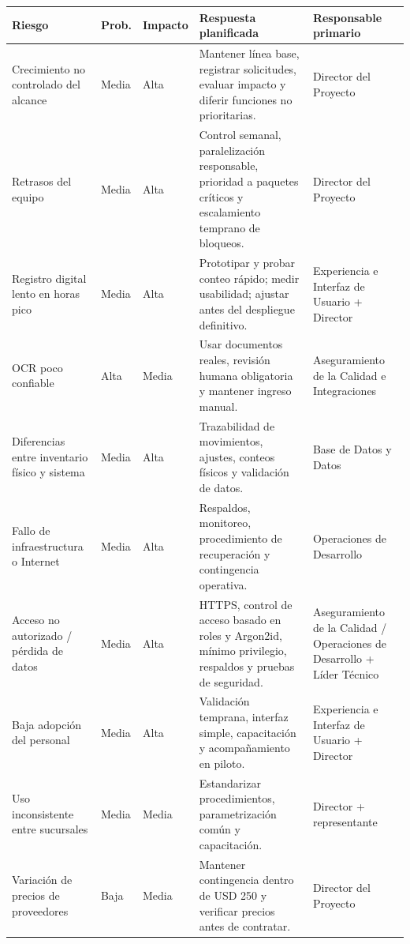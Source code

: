 \documentclass[12pt,a4paper]{article}
\begin{document}
\begin{landscape}
\begin{center}
\renewcommand{\arraystretch}{1.15}
\small
\begin{longtable}{|p{3.8cm}|p{2cm}|p{2cm}|p{6.8cm}|p{4.2cm}|}
\hline
\rowcolor{tableheader}
\textbf{Riesgo} & \textbf{Prob.} & \textbf{Impacto} & \textbf{Respuesta planificada} & \textbf{Responsable primario} \\ \hline
Crecimiento no controlado del alcance & Media & Alta & Mantener línea base, registrar solicitudes, evaluar impacto y diferir funciones no prioritarias. & Director del Proyecto \\ \hline
Retrasos del equipo & Media & Alta & Control semanal, paralelización responsable, prioridad a paquetes críticos y escalamiento temprano de bloqueos. & Director del Proyecto \\ \hline
Registro digital lento en horas pico & Media & Alta & Prototipar y probar conteo rápido; medir usabilidad; ajustar antes del despliegue definitivo. & Experiencia e Interfaz de Usuario + Director \\ \hline
OCR poco confiable & Alta & Media & Usar documentos reales, revisión humana obligatoria y mantener ingreso manual. & Aseguramiento de la Calidad e Integraciones \\ \hline
Diferencias entre inventario físico y sistema & Media & Alta & Trazabilidad de movimientos, ajustes, conteos físicos y validación de datos. & Base de Datos y Datos \\ \hline
Fallo de infraestructura o Internet & Media & Alta & Respaldos, monitoreo, procedimiento de recuperación y contingencia operativa. & Operaciones de Desarrollo \\ \hline
Acceso no autorizado / pérdida de datos & Media & Alta & HTTPS, control de acceso basado en roles y Argon2id, mínimo privilegio, respaldos y pruebas de seguridad. & Aseguramiento de la Calidad / Operaciones de Desarrollo + Líder Técnico \\ \hline
Baja adopción del personal & Media & Alta & Validación temprana, interfaz simple, capacitación y acompañamiento en piloto. & Experiencia e Interfaz de Usuario + Director \\ \hline
Uso inconsistente entre sucursales & Media & Media & Estandarizar procedimientos, parametrización común y capacitación. & Director + representante \\ \hline
Variación de precios de proveedores & Baja & Media & Mantener contingencia dentro de USD 250 y verificar precios antes de contratar. & Director del Proyecto \\ \hline
\end{longtable}
\end{center}
\end{landscape}
\end{document}

